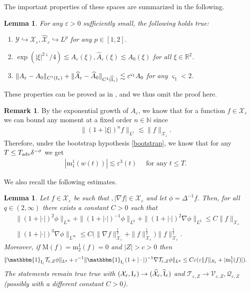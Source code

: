 \documentclass[11pt,reqno,a4paper]{amsart}
\def\eps{\varepsilon}
\def\RR {\mathbb{R}}
\def\NN {\mathbb{N}}
\newcommand{\cQ}{\mathcal{Q}}
\newcommand{\cT}{\mathcal{T}}
\newcommand{\cV}{\mathcal{V}}
\newcommand{\cX}{\mathcal{X}}
\newcommand{\cY}{\mathcal{Y}}
\newcommand{\mrm}{\mathrm{m}}
\newcommand{\mrM}{\mathrm{M}}
\newcommand{\1}{\mathbbm{1}}
\newtheorem{lemma}[proposition]{Lemma}
\theoremstyle{definition}
\newtheorem{remark}[proposition]{Remark}
\theoremstyle{definition}
\numberwithin{equation}{section}
\begin{document}
The important  properties of these spaces are summarized in the following. 
\begin{lemma}
\label{lem:Aeps}
For any $\eps>0$ sufficiently small, the following holds true:
\begin{enumerate}[label=\roman*)]
    \item $\cY\hookrightarrow\cX_{\eps},\widehat{\cX}_{\eps}\hookrightarrow L^p$ for any $p\in [1,2]$.
    \medskip
    \item $\exp(|\xi|^{2\varsigma}/4)\lesssim A_{\eps}(\xi),\widehat{A}_\eps(\xi)\lesssim A_0(\xi)$ for all $\xi\in \RR^2$.
        \medskip
    \item $\|A_\eps-A_0\|_{C^1({\rm I}_\eps)}+\|\widehat{A}_\eps-\widehat{A}_0\|_{C^1({\rm \widehat I}_\eps)}\lesssim \eps^{\varsigma_1}A_0$ for any $\varsigma_1<2$.
\end{enumerate}

\end{lemma}
These properties can be proved as in \cite[Proposition 4.4]{dolce2024long}, and we thus omit the proof here.
\begin{remark}
\label{rem:momXeps}
    By the exponential growth of $A_\eps$, we know that for a function $f\in \cX_\eps$  we can bound any moment at a fixed order $n\in \NN$ since
\begin{align}
\|(1+|\xi|)^nf\|_{L^1}\lesssim\|f\|_{\cX_\eps}.
\end{align}
Therefore, under the bootstrap hypothesis \cref{bootstrap}, we know that for any $T\leq T_{\rm adv}\delta^{-\sigma}$ we get
\begin{align}
\label{bd:m11boot}
    |\mrm_1^1(w(t))|\lesssim \eps^3(t)\quad \text{ for any } t\leq T.
\end{align}
\end{remark}
We also recall the following  estimates.
\begin{lemma}
\label{lem:bounds}
    Let $f\in \cX_{\eps}$ be such that $,|\nabla f|\in \cX_{\eps}$ and let $\phi=\Delta^{-1}f$. Then, for all $q\in (2,\infty)$ there exists a constant $C>0$ such that 
    \begin{align}
    \label{bd:LinftyLq}&\|(1+|\cdot|)^{2}\phi\|_{L^\infty}+\|(1+|\cdot|)^{-1}\phi\|_{L^q}+\|(1+|\cdot|)^{2}\nabla \phi\|_{L^q}\leq C\|f\|_{\cX_{\eps}}\\
\label{bd:nablaLinfty}&\|(1+|\cdot|)^{3}\nabla \phi\|_{L^\infty}\leq C\big(\|\nabla f\|_{\cX_{\eps}}^\frac12+\|f\|_{\cX_{\eps}}^\frac12\big)\|f\|_{\cX_{\eps}}^\frac12.
\end{align}
Moreover, if $\mrM(f)=\mrm^1_2(f)=0$ and $|Z|>c>0$ then
\begin{align}
\label{bd:InnerLq}
\|\mathbbm{1}_{\rm I_\eps}\cT_{\eps,Z }\phi\|_{L^q}+\eps^{-1}\|\mathbbm{1}_{\rm I_\eps}(1+|\cdot|)^{-1}\nabla \cT_{\eps,Z }\phi\|_{L^q}\leq C\eps(\eps\|f\|_{\cX_\eps}+ |\mrm_1^1(f)|).
    \end{align}
    The statements remain true true with $(\cX_\eps,{\rm I}_\eps)\to (\widehat{\cX}_\eps,{\rm \widehat{I}}_\eps)$ and $\cT_{\eps,Z}\to \cV_{\eps,Z},\cQ_{\eps,Z}$ (possibly with a different constant $C>0$). 
\end{lemma}
\end{document}

